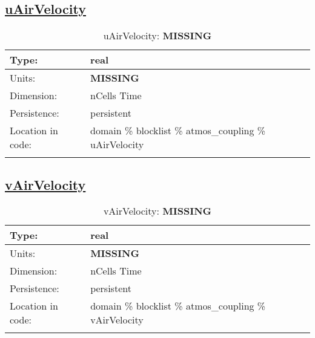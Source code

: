 \subsection[uAirVelocity]{\hyperref[sec:var_tab_atmos_coupling]{uAirVelocity}}
\label{subsec:var_sec_atmos_coupling_uAirVelocity}
\begin{center}
\begin{longtable}{| p{2.0in} | p{4.0in} |}
        \hline 
        Type: & real \\
        \hline 
        Units: & {\bf \color{red} MISSING} \\
        \hline 
        Dimension: & nCells Time \\
        \hline 
        Persistence: & persistent \\
        \hline 
         Location in code: & domain \% blocklist \% atmos\_coupling \% uAirVelocity \\
         \hline 
    \caption{uAirVelocity: {\bf \color{red} MISSING}}
\end{longtable}
\end{center}
\subsection[vAirVelocity]{\hyperref[sec:var_tab_atmos_coupling]{vAirVelocity}}
\label{subsec:var_sec_atmos_coupling_vAirVelocity}
\begin{center}
\begin{longtable}{| p{2.0in} | p{4.0in} |}
        \hline 
        Type: & real \\
        \hline 
        Units: & {\bf \color{red} MISSING} \\
        \hline 
        Dimension: & nCells Time \\
        \hline 
        Persistence: & persistent \\
        \hline 
         Location in code: & domain \% blocklist \% atmos\_coupling \% vAirVelocity \\
         \hline 
    \caption{vAirVelocity: {\bf \color{red} MISSING}}
\end{longtable}
\end{center}
